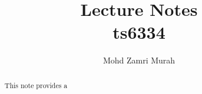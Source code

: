 \documentclass{article}
\title{Lecture Notes \\
ts6334}
\author{Mohd Zamri Murah}
\begin{document}
	
\maketitle

\begin{abstract}
	This note provides a 
\end{abstract}	
	
\end{document}
